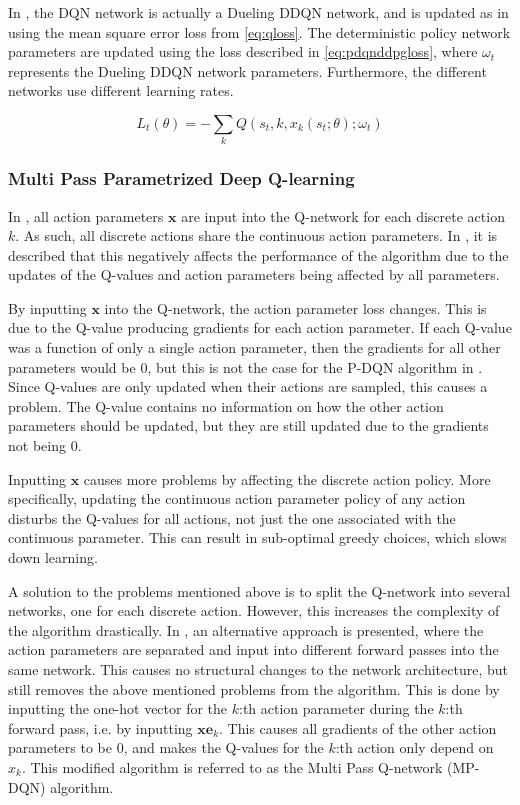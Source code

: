\documentclass{kththesis}
\begin{document}
In \parencite{xiong2018parametrized}, the DQN network is actually a Dueling DDQN network, and is updated as in \parencite{mnih2015human} using the mean square error loss from \autoref{eq:qloss}. The deterministic policy network parameters are updated using the loss described in \autoref{eq:pdqnddpgloss}, where $\omega_t$ represents the Dueling DDQN network parameters. Furthermore, the different networks use different learning rates.

\begin{equation}
\label{eq:pdqnddpgloss}
L_t(\theta) = -\sum_kQ(s_t, k, x_k(s_t;\theta);\omega_t)
\end{equation}

\subsubsection{Multi Pass Parametrized Deep Q-learning}
In \parencite{xiong2018parametrized}, all action parameters $\boldsymbol{x}$ are input into the Q-network for each discrete action $k$. As such, all discrete actions share the continuous action parameters. In \parencite{bester2019mpdqn}, it is described that this negatively affects the performance of the algorithm due to the updates of the Q-values and action parameters being affected by all parameters. 

By inputting $\boldsymbol{x}$ into the Q-network, the action parameter loss changes. This is due to the Q-value producing gradients for each action parameter. If each Q-value was a function of only a single action parameter, then the gradients for all other parameters would be $0$, but this is not the case for the P-DQN algorithm in \parencite{xiong2018parametrized}. Since Q-values are only updated when their actions are sampled, this causes a problem. The Q-value contains no information on how the other action parameters should be updated, but they are still updated due to the gradients not being $0$. 

Inputting $\boldsymbol{x}$ causes more problems by affecting the discrete action policy. More specifically, updating the continuous action parameter policy of any action disturbs the Q-values for all actions, not just the one associated with the continuous parameter. This can result in sub-optimal greedy choices, which slows down learning. \parencite{bester2019mpdqn}

A solution to the problems mentioned above is to split the Q-network into several networks, one for each discrete action. However, this increases the complexity of the algorithm drastically. In \parencite{bester2019mpdqn}, an alternative approach is presented, where the action parameters are separated and input into different forward passes into the same network. This causes no structural changes to the network architecture, but still removes the above mentioned problems from the algorithm. This is done by inputting the one-hot vector for the $k$:th action parameter during the $k$:th forward pass, i.e. by inputting $\boldsymbol{x}\boldsymbol{e}_k$. This causes all gradients of the other action parameters to be $0$, and makes the Q-values for the $k$:th action only depend on $x_k$. This modified algorithm is referred to as the Multi Pass Q-network (MP-DQN) algorithm. \parencite{bester2019mpdqn}
\end{document}
